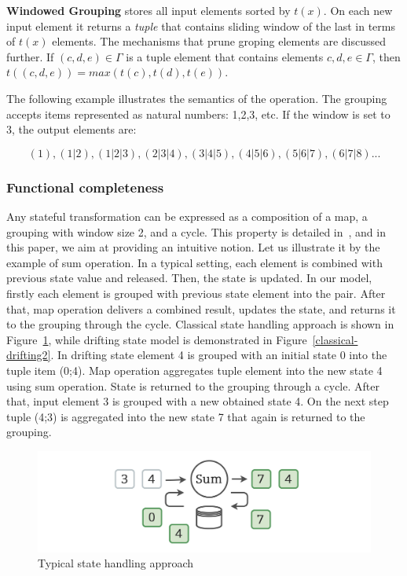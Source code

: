 {\bf Windowed Grouping} stores all input elements sorted by $t(x)$. On each new input element it returns a {\em tuple} that contains sliding window of the last in terms of $t(x)$ elements. The mechanisms that prune groping elements are discussed further. If $(c,d,e)\in \Gamma$ is a tuple element that contains elements $c,d,e \in \Gamma$, then $t((c,d,e))=max(t(c),t(d),t(e))$. 

The following example illustrates the semantics of the operation. The grouping accepts items represented as natural numbers: 1,2,3, etc. If the window is set to 3, the output elements are:

\[(1), (1|2), (1|2|3), (2|3|4), (3|4|5), (4|5|6), (5|6|7), (6|7|8)...\]

\subsubsection{Functional completeness}

Any stateful transformation can be expressed as a composition of a map, a grouping with window size 2, and a cycle. This property is detailed in~\cite{we2018adbis}, and in this paper, we aim at providing an intuitive notion. Let us illustrate it by the example of sum operation. In a typical setting, each element is combined with previous state value and released. Then, the state is updated. In our model, firstly each element is grouped with previous state element into the pair. After that, map operation delivers a combined result, updates the state, and returns it to the grouping through the cycle. Classical state handling approach is shown in Figure~\ref{classical-drifting}, while drifting state model is demonstrated in Figure~\ref{classical-drifting2}. In drifting state element 4 is grouped with an initial state 0 into the tuple item (0;4). Map operation aggregates tuple element into the new state 4 using sum operation. State is returned to the grouping through a cycle. After that, input element 3 is grouped with a new obtained state 4. On the next step tuple (4;3) is aggregated into the new state 7 that again is returned to the grouping.   

\begin{figure}[htbp]
  \centering
  \includegraphics[width=.49\textwidth]{pics/classical-drifting}
  \caption{Typical state handling approach}
  \label {classical-drifting}
\end{figure}

